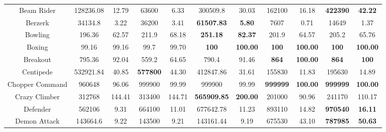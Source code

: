 \documentclass[nohyperref]{article}
\newcommand{\best}[1]{\textbf{#1}}
\theoremstyle{plain}
\begin{document}
\begin{table}[!hb]
\begin{center}
\begin{tabular}{ |c| c c| c c| c c| c c| c c| }
 Beam Rider         & 128236.08         & 12.79             & 63600           & 6.33           & 300509.8             &30.03                     &162100            &16.18              &\textbf{422390}     &\textbf{42.22}            \\
 Berzerk            & 34134.8           & 3.22              & 36200           & 3.41           & \textbf{61507.83}    &\textbf{5.80}             &7607              &0.71               &14649      &1.37         \\
 Bowling            & 196.36            & 62.57             & 211.9           & 68.18          & \textbf{251.18}      &\textbf{82.37}            &201.9             &64.57              &205.2      &65.76   \\
 Boxing             & 99.16             & 99.16             & 99.7            & 99.70          & \textbf{100}         &\textbf{100.00}           &\best{100}        &\textbf{100.00}    &\textbf{100} &\textbf{100.00}      \\
 Breakout           & 795.36            & 92.04             & 559.2           & 64.65          & 790.4                &91.46                     &\best{864}        &\textbf{100.00}    &\textbf{864}     &\textbf{100}          \\
 Centipede          & 532921.84         & 40.85             & \textbf{577800} & 44.30          & 412847.86            &31.61                     &155830            &11.83              &195630    &14.89\\
 Chopper Command    &960648             & 96.06             &999900           & 99.99          &999900                &99.99                     &\best{999999}     &\textbf{100.00}    &\textbf{999999}  &\textbf{100.00} \\
 Crazy Climber      & 312768            & 144.41            & 313400          & 144.71         &\textbf{565909.85}    &\textbf{200.00}           &201000            &90.96              &241170    &110.17      \\
 Defender           & 562106            & 9.31              & 664100          & 11.01          & 677642.78            &11.23                     &893110            &14.82              &\textbf{970540}&\textbf{16.11}          \\
 Demon Attack       & 143664.6          & 9.22              & 143500          & 9.21           & 143161.44            &9.19                      &675530            &43.10              &\textbf{787985}   &\textbf{50.63}           \\

\end{tabular}
\end{center}
\end{table}
\end{document}
